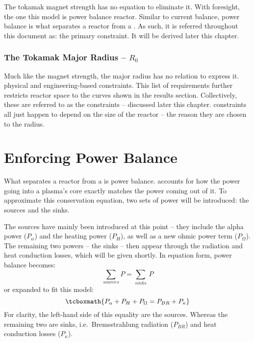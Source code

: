 The tokamak magnet strength has no  equation to eliminate it. With foresight, the one this model  is  power balance  reactor. Similar to current balance, power balance is what separates a reactor from a . As such, it is referred throughout this document as: the primary constraint. It will be derived later this chapter.

\subsubsection{The Tokamak Major Radius -- $R_0$}

Much like the magnet strength, the major radius has no  relation to express it.  physical and engineering-based constraints. This  list of requirements further restricts reactor space to the curves shown in the results section. Collectively, these are referred to as the  constraints -- discussed later this chapter.  constraints all just happen to depend on the size of the reactor -- the reason they are chosen to  the radius.

\section{Enforcing Power Balance}

What separates a reactor from a  is power balance.  accounts for how the power going into a plasma's core exactly matches the power coming out of it. To approximate this conservation equation, two sets of power will be introduced: the sources and the sinks.

The sources have mainly been introduced at this point -- they include the alpha power ($P_\alpha$)  and the heating power ($P_H$), as well as a new ohmic power term ($P_\Omega$). The remaining two powers -- the sinks -- then appear through the radiation and heat conduction losses, which will be given shortly. In equation form, power balance becomes:
\begin{equation}
	\sum_{sources} P = \sum_{sinks} \, P
\end{equation}
or expanded to fit this model:
\begin{equation}
	\label{eq:power_balance}
	\tcboxmath{
	P_\alpha + P_H + P_\Omega = P_{BR} + P_\kappa
	}
\end{equation}
For clarity, the left-hand side of this equality are the sources. Whereas the remaining two are sinks, i.e.\ Bremsstrahlung radiation ($P_{BR}$) and heat conduction losses ($P_\kappa$).

